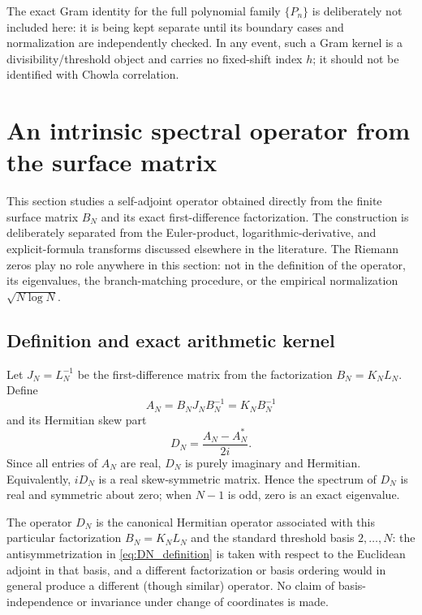 \documentclass[11pt]{amsart}
\numberwithin{equation}{section}
\theoremstyle{plain}
\theoremstyle{definition}
\theoremstyle{remark}
\begin{document}
The exact Gram identity for the full polynomial family $\{P_n\}$ is deliberately not included here: it is being kept separate until its boundary cases and normalization are independently checked.  In any event, such a Gram kernel is a divisibility/threshold object and carries no fixed-shift index $h$; it should not be identified with Chowla correlation.

\section{An intrinsic spectral operator from the surface matrix}
\label{sec:intrinsic_spectral_operator}

This section studies a self-adjoint operator obtained directly from the finite surface matrix $B_N$ and its exact first-difference factorization.  The construction is deliberately separated from the Euler-product, logarithmic-derivative, and explicit-formula transforms discussed elsewhere in the literature.  The Riemann zeros play no role anywhere in this section: not in the definition of the operator, its eigenvalues, the branch-matching procedure, or the empirical normalization $\sqrt{N\log N}$.

\subsection{Definition and exact arithmetic kernel}
\label{subsec:intrinsic_operator_definition}

Let $J_N=L_N^{-1}$ be the first-difference matrix from the factorization $B_N=K_NL_N$.  Define
\begin{equation}
A_N=B_NJ_NB_N^{-1}=K_NB_N^{-1}
\label{eq:AN_definition}
\end{equation}
and its Hermitian skew part
\begin{equation}
D_N=\frac{A_N-A_N^*}{2i}.
\label{eq:DN_definition}
\end{equation}
Since all entries of $A_N$ are real, $D_N$ is purely imaginary and Hermitian.  Equivalently, $iD_N$ is a real skew-symmetric matrix.  Hence the spectrum of $D_N$ is real and symmetric about zero; when $N-1$ is odd, zero is an exact eigenvalue.

The operator $D_N$ is the canonical Hermitian operator associated with this particular factorization $B_N=K_NL_N$ and the standard threshold basis $2,\ldots,N$: the antisymmetrization in \eqref{eq:DN_definition} is taken with respect to the Euclidean adjoint in that basis, and a different factorization or basis ordering would in general produce a different (though similar) operator.  No claim of basis-independence or invariance under change of coordinates is made.
\end{document}
